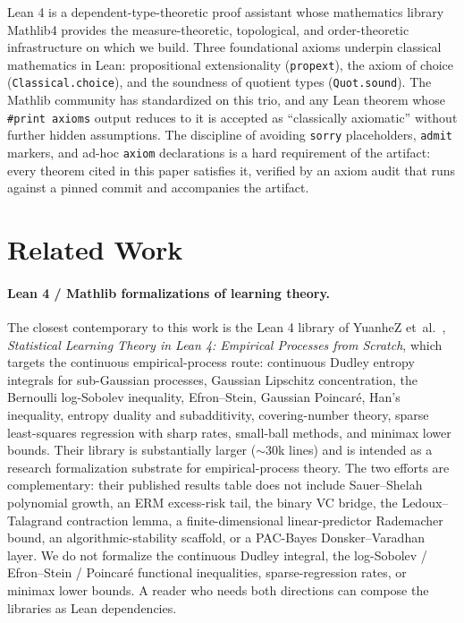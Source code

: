 \documentclass[sigplan,anonymous,review,screen]{acmart}
\begin{document}
Lean 4 \cite{deMoura2021} is a dependent-type-theoretic proof
assistant whose mathematics library Mathlib4
\cite{Mathlib2020} provides the measure-theoretic, topological,
and order-theoretic infrastructure on which we build. Three
foundational axioms underpin classical mathematics in Lean: propositional
extensionality (\texttt{propext}), the axiom of choice
(\texttt{Classical.choice}), and the soundness of quotient types
(\texttt{Quot.sound}). The Mathlib community has standardized on this
trio, and any Lean theorem whose \texttt{\#print axioms} output reduces
to it is accepted as ``classically axiomatic'' without further hidden
assumptions. The discipline of avoiding \texttt{sorry} placeholders,
\texttt{admit} markers, and ad-hoc \texttt{axiom} declarations is a
hard requirement of the artifact: every theorem cited in this paper
satisfies it, verified by an axiom audit
that runs against a pinned commit and accompanies the artifact.

\section{Related Work}
\label{sec:related}

\paragraph{Lean 4 / Mathlib formalizations of learning theory.}
The closest contemporary to this work is the Lean 4 library of
YuanheZ et~al.\ \cite{YuanheZ2026}, \emph{Statistical Learning
Theory in Lean 4: Empirical Processes from Scratch}, which targets the
continuous empirical-process route: continuous Dudley entropy
integrals for sub-Gaussian processes, Gaussian Lipschitz concentration,
the Bernoulli log-Sobolev inequality, Efron--Stein, Gaussian
Poincar\'e, Han's inequality, entropy duality and subadditivity,
covering-number theory, sparse least-squares regression with sharp
rates, small-ball methods, and minimax lower bounds. Their library is
substantially larger ($\sim$30k lines) and is intended as a research
formalization substrate for empirical-process theory. The two efforts
are complementary: their published results table does not include
Sauer--Shelah polynomial growth, an ERM excess-risk tail, the binary VC
bridge, the Ledoux--Talagrand contraction lemma, a finite-dimensional
linear-predictor Rademacher bound, an algorithmic-stability scaffold,
or a PAC-Bayes Donsker--Varadhan layer. We do not formalize the
continuous Dudley integral, the log-Sobolev / Efron--Stein / Poincar\'e
functional inequalities, sparse-regression rates, or minimax lower
bounds. A reader who needs both directions can compose the libraries
as Lean dependencies.
\end{document}
